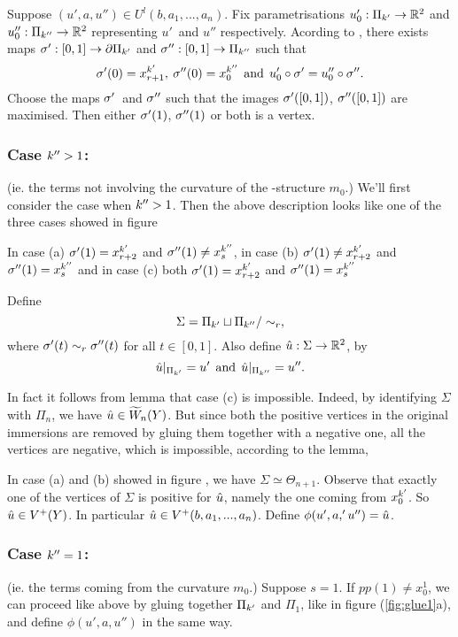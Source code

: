 Suppose $(u', a, u'') \in U^l(b, a_1, ..., a_n)$. Fix
parametrisations $u'_0: \Pi_{k'} \to \mathbb{R}^2$ and $u''_0 : \Pi_{k''} \to \mathbb{R}^2$
representing $u'$ and $u''$ respectively. Acording to ,
there exists maps $\sigma' : [0,1] \to \partial
\Pi_{k'}$ and $\sigma'':[0,1]\to \Pi_{k''}$ such that 
\[ \sigma'(0) = x^{k'}_{r+1} , \: \sigma''(0) = x^{k''}_0  \:\:\text{and}\:\: u'_0 \circ \sigma' =
u''_0 \circ \sigma''. \]
Choose the maps $\sigma'$ and $\sigma''$ such that the images $\sigma'([0,1])$, $\sigma''([0,1])$
are maximised. Then either $\sigma'(1)$, $\sigma''(1)$ or both is a vertex.

\subsubsection{Case ${k''}>1$:}
(ie. the terms not involving the curvature of the \Ainf-structure $m_0$.)
We'll first consider the case when ${k''} > 1$. Then the above description
looks like one of the three cases showed in figure 


In case (a) $\sigma'(1) = x^{k'}_{r+2}$ and $\sigma''(1) \ne x^{k''}_s$, in case (b)
$\sigma'(1)
\ne
x^{k'}_{r+2}$ and $\sigma''(1) = x^{k''}_s$ and in case (c) both $\sigma'(1) = x^{k'}_{r+2}$ and
$\sigma''(1) = x^{k''}_s$

Define
\[ \Sigma = \Pi_{k'} \sqcup \Pi_{k''} / \sim_r, \]
where $\sigma'(t) \sim_r \sigma''(t)$ for all $t\in [0,1]$. Also define 
$\hat{u} : \Sigma \to \mathbb{R}^2$, by
\[  \hat{u}|_{\Pi_{k'}} = u' \:\:\text{and}\:\: \hat{u}|_{\Pi_{k''}} = u''.  \] 

In fact it follows from lemma  
that case (c) is impossible. Indeed, by identifying $\Sigma$ with $\Pi_n$, we
have $\hat{u} \in \widetilde{W}_n(Y)$. But since both the positive vertices in the
original immersions are removed by gluing them together with a negative one, all
the vertices are negative, which is impossible, according to the lemma,

In case (a) and (b) showed in figure , we have $\Sigma \simeq
\Theta_{n+1}$. Observe that exactly one of the vertices of $\Sigma$ is
positive for $\hat{u}$, namely the one coming from $x^{k'}_0$. So $\hat{u}\in V^+(Y)$. In
particular $\hat{u} \in V^+(b,a_1,...,a_n)$. Define $\phi(u',a,'u'') = \hat{u}$. 

\subsubsection{Case ${k''}=1$:}
(ie. the terms coming from the curvature $m_0$.)
Suppose $s=1$. If $
pp(1) \ne x^1_0$, we can proceed like above by gluing
together $\Pi_{k'}$ and $\Pi_1$, like in figure (\ref{fig:glue1}a), and define
$\phi(u',a,u'')$ in the same way.

